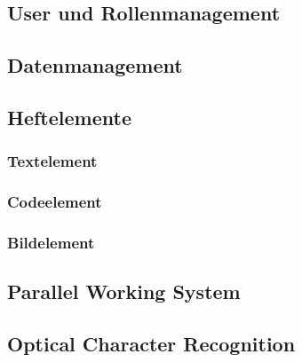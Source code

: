 \documentclass[12pt]{article}
\begin{document}
\newpage

\subsection{User und Rollenmanagement}
\label{subsec:usermanagement}


\newpage

\subsection{Datenmanagement}
\label{subsec:datenmanagement}


\newpage

\subsection{Heftelemente}
\label{subsec:heftelement}


\subsubsection{Textelement}
\label{subsubsec:textelement}


\newpage

\subsubsection{Codeelement}
\label{subsubsec:codeelement}


\newpage

\subsubsection{Bildelement}
\label{subsubsec:bildelement}


\newpage

\subsection{Parallel Working System}
\label{subsec:parallelws}


\newpage

\subsection{Optical Character Recognition}
\label{subsec:ocr}

\end{document}
